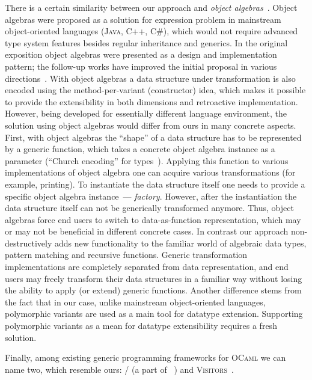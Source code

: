 There is a certain similarity between our approach and \emph{object algebras}~\cite{ObjectAlgebras}. Object algebras were proposed as a solution
for expression problem in mainstream object-oriented languages (\textsc{Java}, \textsc{C++}, \textsc{C\#}), which would not require advanced type system features besides
regular inheritance and generics. In the original exposition object algebras were presented as a design and implementation pattern; the follow-up
works have improved the initial proposal in various directions~\cite{ObjectAlgebrasAttribute,ObjectAlgebrasSYB}.
With object algebras a data structure under transformation is also encoded using the method-per-variant (constructor) idea, which makes it possible to
provide the extensibility in both dimensions and retroactive implementation. However, being developed for essentially different language environment,
the solution using object algebras would differ from ours in many concrete aspects. First, with object algebras the ``shape'' of a data structure has to
be represented by a generic function, which takes a concrete object algebra instance as a parameter (``Church encoding'' for types~\cite{Hinze}). Applying
this function to various implementations of object algebra one can acquire various transformations (for example, printing). To instantiate the data
structure itself one needs to provide a specific object algebra instance~--- \emph{factory}. However, after the instantiation the data structure itself
can not be generically transformed anymore. Thus, object algebras force end users to switch to data-as-function representation, which may or may not be
beneficial in different concrete cases. In contrast our approach non-destructively adds new functionality to the familiar world of algebraic data types,
pattern matching and recursive functions. Generic transformation implementations are completely separated from data representation, and end users may
freely transform their data structures in a familiar way without losing the ability to apply (or extend) generic functions. Another difference stems
from the fact that in our case, unlike mainstream object-oriented languages, polymorphic variants are used as a main tool for datatype extension.
Supporting polymorphic variants as a mean for datatype extensibility requires a fresh solution.

Finally, among existing generic programming frameworks for \textsc{OCaml} we can name two, which resemble ours: /
(a part of ~\cite{PPXLib}) and \textsc{Visitors}~\cite{Visitors}.

